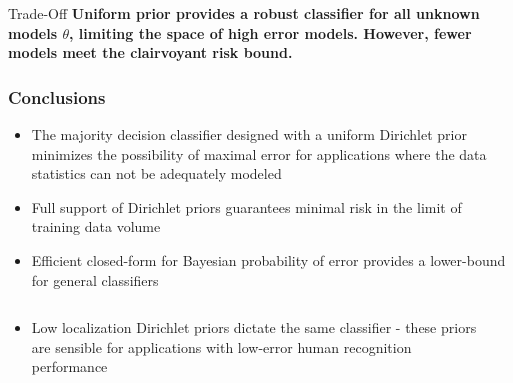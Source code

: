 \documentclass{beamer}
\begin{document}
\begin{frame}
\begin{columns}[c]
\begin{column}{.5\linewidth}
\end{column}

\end{columns}

\vspace{-1.75em}
\begin{block}{Trade-Off}
\textbf{Uniform prior provides a robust classifier for all unknown models $\theta$, limiting the space of high error models. However, fewer models meet the clairvoyant risk bound.}
\end{block}


\end{frame}




\begin{frame}
\frametitle{Conclusions}

\begin{itemize}
\item The majority decision classifier designed with a uniform Dirichlet prior minimizes the possibility of maximal error for applications where the data statistics can not be adequately modeled
\item Full support of Dirichlet priors guarantees minimal risk in the limit of training data volume
\item Efficient closed-form for Bayesian probability of error provides a lower-bound for general classifiers
\end{itemize}

\begin{columns}[T]

\begin{column}{.55\linewidth}

\begin{itemize}
\item Low localization Dirichlet priors dictate the same classifier - these priors are sensible for applications with low-error human recognition performance
\end{itemize}

\end{column}

\begin{column}{.4\linewidth}


\end{column}
\end{columns}
\end{frame}
\end{document}
